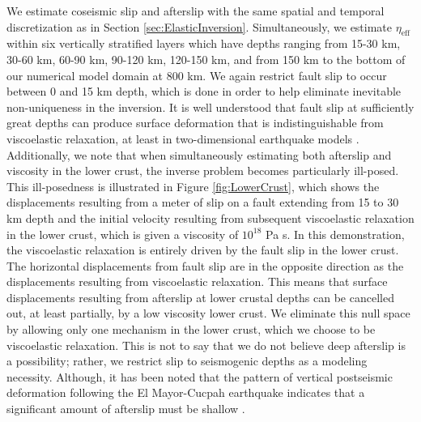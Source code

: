 \documentclass[draft,linenumbers]{AGUJournal}
\begin{document}
We estimate coseismic slip and afterslip with the same spatial and temporal discretization as in Section \ref{sec:ElasticInversion}. Simultaneously, we estimate $\eta_{\mathrm{eff}}$ within six vertically stratified layers which have depths ranging from 15-30 km, 30-60 km, 60-90 km, 90-120 km, 120-150 km, and from 150 km to the bottom of our numerical model domain at 800 km.  We again restrict fault slip to occur between 0 and 15 km depth, which is done in order to help eliminate inevitable non-uniqueness in the inversion.  It is well understood that fault slip at sufficiently great depths can produce surface deformation that is indistinguishable from viscoelastic relaxation, at least in two-dimensional earthquake models \citep{Savage1990}.  Additionally, we note that when simultaneously estimating both afterslip and viscosity in the lower crust, the inverse problem becomes particularly ill-posed. This ill-posedness is illustrated in Figure \ref{fig:LowerCrust}, which shows the displacements resulting from a meter of slip on a fault extending from 15 to 30 km depth and the initial velocity resulting from subsequent viscoelastic relaxation in the lower crust, which is given a viscosity of $10^{18}$ Pa s.  In this demonstration, the viscoelastic relaxation is entirely driven by the fault slip in the lower crust.  The horizontal displacements from fault slip are in the opposite direction as the displacements resulting from viscoelastic relaxation.  This means that surface displacements resulting from afterslip at lower crustal depths can be cancelled out, at least partially, by a low viscosity lower crust.  We eliminate this null space by allowing only one mechanism in the lower crust, which we choose to be viscoelastic relaxation.  This is not to say that we do not believe deep afterslip is a possibility; rather, we restrict slip to seismogenic depths as a modeling necessity. Although, it has been noted that the pattern of vertical postseismic deformation following the El Mayor-Cucpah earthquake indicates that a significant amount of afterslip must be shallow \citep{Rollins2015}.  
 
\end{document}
